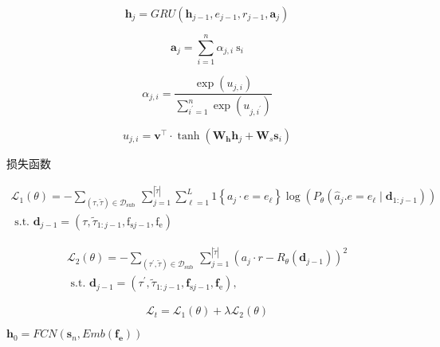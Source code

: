 \begin{equation} \mathbf{h}_{j}=G R U\left(\mathbf{h}_{j-1}, e_{j-1}, r_{j-1}, \mathbf{a}_{j}\right) \end{equation}

\begin{equation}
\mathbf{a}_{j}=\sum_{i=1}^{n} \alpha_{j, i} \mathrm{~s}_{i}
\end{equation}

\begin{equation}
\alpha_{j, i}=\frac{\exp \left(u_{j, i}\right)}{\sum_{i^{\prime}=1}^{n} \exp \left(u_{j, i^{\prime}}\right)}
\end{equation}

\begin{equation}
u_{j, i}=\mathbf{v}^{\top} \cdot \tanh \left(\mathbf{W}_{\mathbf{h}} \mathbf{h}_{j}+\mathbf{W}_{s} \mathbf{s}_{i}\right)
\end{equation}

损失函数

\begin{equation}
\begin{gathered}
\mathcal{L}_{1}(\theta)=-\sum_{(\tau, \tilde{\tau}) \in \mathcal{D}_{\text {sub }}} \sum_{j=1}^{|\tilde{\tau}|} \sum_{\ell=1}^{L} 1\left\{a_{j} \cdot e=e_{\ell}\right\} \log \left(P_{\theta}\left(\hat{a}_{j} . e=e_{\ell} \mid \mathbf{d}_{1: j-1}\right)\right) \\
\text { s.t. } \mathbf{d}_{j-1}=\left(\tau, \tilde{\tau}_{1: j-1}, \mathrm{f}_{\mathrm{s} j-1}, \mathrm{f}_{\mathrm{e}}\right)
\end{gathered}
\end{equation}

\begin{equation}
\begin{aligned}
\mathcal{L}_{2}(\theta)=-\sum_{\left(\tau^{\prime}, \tilde{\tau}\right) \in \mathcal{D}_{\text {sub }}} \sum_{j=1}^{|\tilde{\tau}|}\left(a_{j} \cdot r-R_{\theta}\left(\mathbf{d}_{j-1}\right)\right)^{2} \\
\text { s.t. } \mathbf{d}_{j-1}=\left(\tau^{\prime}, \tilde{\tau}_{1: j-1}, \mathbf{f}_{\mathrm{s} j-1}, \mathbf{f}_{\mathrm{e}}\right),
\end{aligned}
\end{equation}

\begin{equation}\mathcal{L}_t = \mathcal{L}_1(\theta) + \lambda \mathcal{L}_2(\theta)\end{equation}

$\mathbf{h}_{0}=FCN(\mathbf{s} _n, Emb(\mathbf{f_e} ))$

